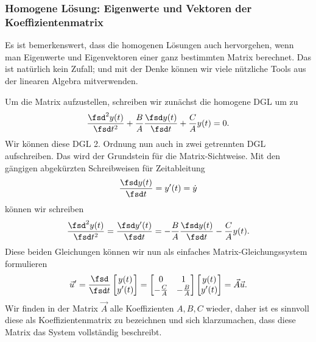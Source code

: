 \subsubsection{Homogene Lösung: Eigenwerte und Vektoren der Koeffizientenmatrix}
%
Es ist bemerkenswert, dass die homogenen Lösungen
auch hervorgehen, wenn man Eigenwerte und Eigenvektoren einer ganz bestimmten Matrix
berechnet. Das ist natürlich kein Zufall; und mit der Denke können wir viele
nützliche Tools aus der linearen Algebra mitverwenden.

Um die Matrix aufzustellen, schreiben wir zunächst die homogene DGL um zu
\begin{align}
\frac{\fsd^2 y(t)}{\fsd t^2} + \frac{B}{A} \frac{\fsd y(t)}{\fsd t} + \frac{C}{A} y(t) = 0.
\end{align}
%
Wir können diese DGL 2. Ordnung nun auch in zwei getrennten DGL aufschreiben. Das wird
der Grundstein für die Matrix-Sichtweise.
%
Mit den gängigen abgekürzten Schreibweisen für Zeitableitung
\begin{align}
\frac{\fsd y(t)}{\fsd t} = y'(t) = \dot{y}
\end{align}
können wir schreiben
\begin{align}
\frac{\fsd^2 y(t)}{\fsd t^2} = \frac{\fsd y'(t)}{\fsd t} = - \frac{B}{A}  \frac{\fsd y(t)}{\fsd t} - \frac{C}{A}  y(t).
\end{align}
%
Diese beiden Gleichungen können wir nun als einfaches Matrix-Gleichungssystem formulieren
\begin{align}
\label{eq:A7BEE9E24E_uAU}
\vec{u}' = \frac{\fsd}{\fsd t}
\begin{bmatrix}
y(t) \\ y'(t)
\end{bmatrix}
=
\begin{bmatrix}
0 & 1 \\ - \frac{C}{A} & - \frac{B}{A}
\end{bmatrix}
\begin{bmatrix}
y(t) \\ y'(t)
\end{bmatrix}
=
\vec{A} \vec{u}.
\end{align}
%
Wir finden in der Matrix $\vec{A}$ alle Koeffizienten $A,B,C$ wieder, daher
ist es sinnvoll diese als Koeffizientenmatrix zu bezeichnen und sich klarzumachen,
dass diese Matrix das System vollständig beschreibt.

